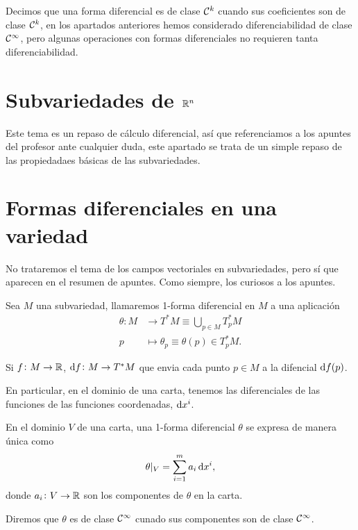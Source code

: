 \begin{defi}
    Decimos que una forma diferencial es de clase $\mathcal{C}^k$ cuando sus coeficientes son de clase $\mathcal{C}^k$, en los apartados anteriores hemos
    considerado diferenciabilidad de clase $\mathcal{C}^\infty$, pero algunas operaciones con formas diferenciales no requieren tanta diferenciabilidad.
\end{defi}

\section{Subvariedades de $\mathbb{R}^n$}

Este tema es un repaso de cálculo diferencial, así que referenciamos a los apuntes del profesor
ante cualquier duda, este apartado se trata de un simple repaso de las propiedadaes b\'asicas de las
subvariedades.

\section{Formas diferenciales en una variedad}

\begin{obs*}
    No trataremos el tema de los campos vectoriales en subvariedades, pero sí que aparecen en el resumen de apuntes. Como siempre, los curiosos
    a los apuntes.
\end{obs*}

\setcounter{lema}{4}

\begin{defi}
    Sea $M$ una subvariedad, llamaremos 1-forma diferencial en $M$ a una aplicación
    \[
        \begin{aligned}
            \theta \colon M &\to T^\ast M \equiv \bigcup_{p \in M} T^\ast_pM \\
            p &\mapsto \theta_p \equiv \theta(p) \in T^\ast_p M.
        \end{aligned}
    \]
\end{defi}

\begin{obs}
    Si $f \colon M \to \mathbb{R}$, $\dif f \colon M \to T^\ast M$ que envia cada punto $p \in M$ a la difencial $\dif f(p)$.

    En particular, en el dominio de una carta, tenemos las diferenciales de las funciones de las funciones coordenadas, $\dif x^i$.
\end{obs}

\begin{defi}
    En el dominio $V$ de una carta, una 1-forma diferencial $\theta$ se expresa de manera única como
    \[
        \theta \vert_V = \sum^m_{i=1} a_i \dif x^i,
    \]
    donde $a_i \colon V \to \mathbb{R}$ son los componentes de $\theta$ en la carta.

    Diremos que $\theta$ es de clase $\mathcal{C}^\infty$ cunado sus componentes son de clase $\mathcal{C}^\infty$.
\end{defi}

